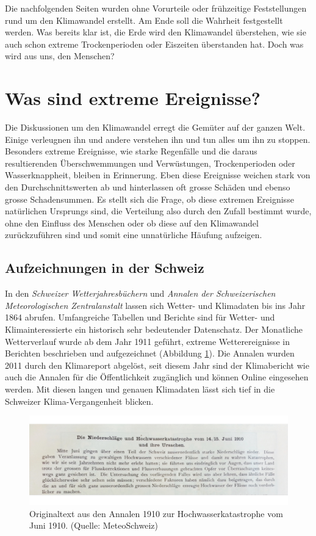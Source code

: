 \begin{refsection}
Die nachfolgenden Seiten wurden ohne Vorurteile oder frühzeitige Feststellungen rund um den Klimawandel erstellt. Am Ende soll die Wahrheit festgestellt werden.
Was bereits klar ist, die Erde wird den Klimawandel überstehen, wie sie auch schon extreme Trockenperioden oder Eiszeiten überstanden hat. Doch was wird aus uns, den Menschen?


\section{Was sind extreme Ereignisse?}
Die Diskussionen um den Klimawandel erregt die Gemüter auf der ganzen Welt. Einige verleugnen ihn und andere verstehen ihn und tun alles um ihn zu stoppen. Besonders extreme Ereignisse, wie starke Regenfälle und die daraus resultierenden Überschwemmungen und Verwüstungen, Trockenperioden oder Wasserknappheit, bleiben in Erinnerung.
Eben diese Ereignisse weichen stark von den Durchschnittswerten ab und hinterlassen oft grosse Schäden und ebenso grosse Schadensummen.
Es stellt sich die Frage, ob diese extremen Ereignisse natürlichen Ursprungs sind, die Verteilung also durch den Zufall bestimmt wurde, ohne den Einfluss des Menschen oder ob diese auf den Klimawandel zurückzuführen sind und somit eine unnatürliche Häufung aufzeigen.


\subsection{Aufzeichnungen in der Schweiz}
In den {\em Schweizer Wetterjahresbüchern} und {\em Annalen der Schweizerischen Meteorologischen Zentralanstalt} lassen sich Wetter- und Klimadaten bis ins Jahr 1864 abrufen. Umfangreiche Tabellen und Berichte sind für Wetter- und Klimainteressierte ein historisch sehr bedeutender Datenschatz. 
Der Monatliche Wetterverlauf wurde ab dem Jahr 1911 geführt, extreme Wetterereignisse in Berichten beschrieben und aufgezeichnet (Abbildung \ref{Annalen}). Die Annalen wurden 2011 durch den Klimareport abgelöst, seit diesem Jahr sind der Klimabericht wie auch die Annalen für die Öffentlichkeit zugänglich und können Online eingesehen werden.
Mit diesen langen und genauen Klimadaten lässt sich tief in die Schweizer Klima-Vergangenheit blicken.

\begin{figure}
\centering
\includegraphics[width=\hsize]{extrem/Annalen.jpg}
\caption{Originaltext aus den Annalen 1910 zur Hochwasserkatastrophe vom Juni 1910. (Quelle: MeteoSchweiz)}
\label{Annalen}
\end{figure}



\end{refsection}
